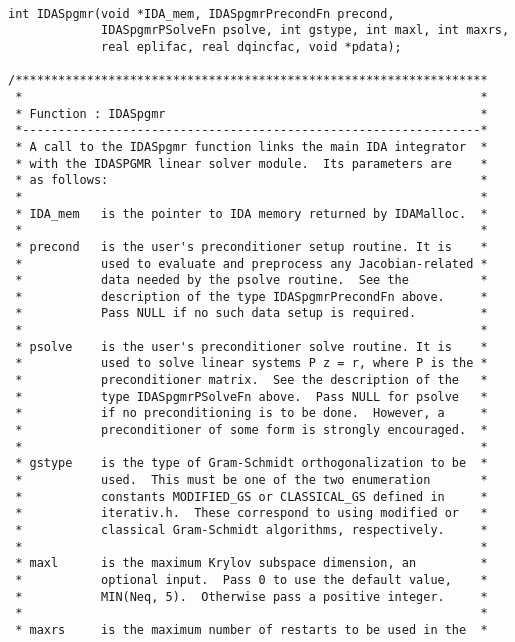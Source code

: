 \small
\begin{verbatim}

int IDASpgmr(void *IDA_mem, IDASpgmrPrecondFn precond, 
             IDASpgmrPSolveFn psolve, int gstype, int maxl, int maxrs,
             real eplifac, real dqincfac, void *pdata); 
 
/******************************************************************
 *                                                                *
 * Function : IDASpgmr                                            *
 *----------------------------------------------------------------*
 * A call to the IDASpgmr function links the main IDA integrator  *
 * with the IDASPGMR linear solver module.  Its parameters are    *
 * as follows:                                                    *
 *                                                                *
 * IDA_mem   is the pointer to IDA memory returned by IDAMalloc.  *
 *                                                                *
 * precond   is the user's preconditioner setup routine. It is    *
 *           used to evaluate and preprocess any Jacobian-related *
 *           data needed by the psolve routine.  See the          *
 *           description of the type IDASpgmrPrecondFn above.     *
 *           Pass NULL if no such data setup is required.         *
 *                                                                *
 * psolve    is the user's preconditioner solve routine. It is    *
 *           used to solve linear systems P z = r, where P is the *
 *           preconditioner matrix.  See the description of the   *
 *           type IDASpgmrPSolveFn above.  Pass NULL for psolve   * 
 *           if no preconditioning is to be done.  However, a     *
 *           preconditioner of some form is strongly encouraged.  *
 *                                                                *
 * gstype    is the type of Gram-Schmidt orthogonalization to be  *
 *           used.  This must be one of the two enumeration       *
 *           constants MODIFIED_GS or CLASSICAL_GS defined in     *
 *           iterativ.h.  These correspond to using modified or   *
 *           classical Gram-Schmidt algorithms, respectively.     *
 *                                                                *
 * maxl      is the maximum Krylov subspace dimension, an         *
 *           optional input.  Pass 0 to use the default value,    *
 *           MIN(Neq, 5).  Otherwise pass a positive integer.     *
 *                                                                *
 * maxrs     is the maximum number of restarts to be used in the  *

\end{verbatim}
